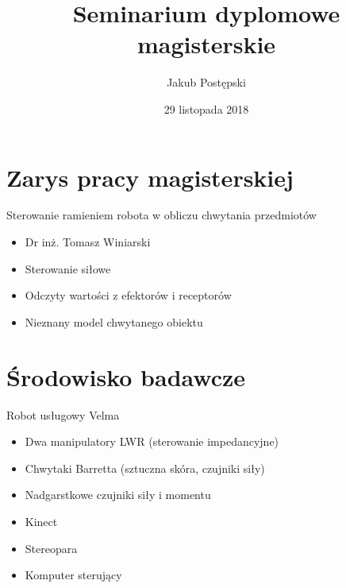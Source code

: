 \documentclass{beamer}
\begin{document}
\title{Seminarium dyplomowe magisterskie}
\author{Jakub Postępski}
\date{29 listopada 2018}

\frame{\titlepage}

\section{Zarys pracy magisterskiej}
\begin{frame}{Sterowanie ramieniem robota w obliczu chwytania przedmiotów}

\begin{itemize}
\item Dr inż. Tomasz Winiarski
\end{itemize}

\begin{itemize}
\item Sterowanie siłowe
\item Odczyty wartości z efektorów i receptorów
\item Nieznany model chwytanego obiektu
\end{itemize}
\end{frame}

\section{Środowisko badawcze}

\begin{frame}{Robot usługowy Velma}
\begin{itemize}
\item Dwa manipulatory LWR (sterowanie impedancyjne)
\item Chwytaki Barretta (sztuczna skóra, czujniki siły)
\item Nadgarstkowe czujniki siły i momentu
\item Kinect
\item Stereopara
\item Komputer sterujący
\end{itemize}
\end{frame}
\end{document}
